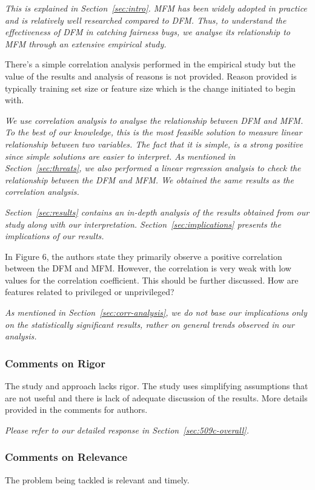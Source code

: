 \documentclass[conference,review,anonymous]{IEEEtran}
\newcommand{\highlight}[1]{\begin{framed}%
  \noindent\emph{#1}
\end{framed}}
\begin{document}
\highlight{This is explained in Section~\ref{sec:intro}. MFM has been
widely adopted in practice and is relatively well researched compared
to DFM. Thus, to understand the effectiveness of DFM in catching
fairness bugs, we analyse its relationship to MFM through an extensive
empirical study.}

There's a simple correlation analysis performed in the empirical study
but the value of the results and analysis of reasons is not
provided. Reason provided is typically training set size or feature
size which is the change initiated to begin with.

\highlight{We use correlation analysis to analyse the relationship
between DFM and MFM. To the best of our knowledge, this is the most
feasible solution to measure linear relationship between two
variables. The fact that it is simple, is a strong positive since
simple solutions are easier to interpret. As mentioned in
Section~\ref{sec:threats}, we also performed a linear regression
analysis to check the relationship between the DFM and MFM. We
obtained the same results as the correlation analysis.}

\highlight{Section~\ref{sec:results} contains an in-depth analysis of
the results obtained from our study along with our
interpretation. Section~\ref{sec:implications} presents the
implications of our results.}

In Figure 6, the authors state they primarily observe a positive
correlation between the DFM and MFM. However, the correlation is very
weak with low values for the correlation coefficient. This should be
further discussed. How are features related to privileged or
unprivileged?

\highlight{As mentioned in Section~\ref{sec:corr-analysis}, we do not
base our implications only on the statistically significant results,
rather on general trends observed in our analysis.}

\subsubsection{Comments on Rigor}

The study and approach lacks rigor. The study uses simplifying
assumptions that are not useful and there is lack of adequate
discussion of the results. More details provided in the comments for
authors.

\highlight{Please refer to our detailed response in
Section~\ref{sec:509c-overall}.}

\subsubsection{Comments on Relevance}
The problem being tackled is relevant and timely.
\end{document}
